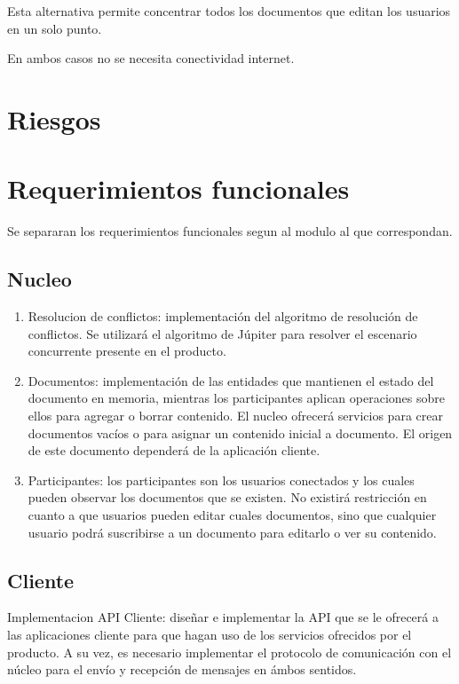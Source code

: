 \documentclass[12pt,a4paper]{article}
\begin{document}
Esta alternativa permite concentrar todos los documentos que editan los usuarios en un solo punto.

En ambos casos no se necesita conectividad internet.	
	
	\section{Riesgos}
	\section{Requerimientos funcionales}
	
	Se separaran los requerimientos funcionales segun al modulo al que correspondan.

	\subsection{Nucleo}
	\begin{enumerate}
	\item Resolucion de conflictos: implementación del algoritmo de resolución de conflictos. Se utilizará el algoritmo de Júpiter \cite{jupiter} para resolver el escenario concurrente presente en el producto.
	\item Documentos: implementación de las entidades que mantienen el estado del documento en memoria, mientras los participantes aplican operaciones sobre ellos para agregar o borrar contenido. El nucleo ofrecerá servicios para crear documentos vacíos o para asignar un contenido inicial a documento. El origen de este documento dependerá de la aplicación cliente.
	\item Participantes: los participantes son los usuarios conectados y los cuales pueden observar los documentos que se existen. No existirá restricción en cuanto a que usuarios pueden editar cuales documentos, sino que cualquier usuario podrá suscribirse a un documento para editarlo o ver su contenido.
	
	\end{enumerate}


	\subsection{Cliente}


Implementacion API Cliente: diseñar e implementar la API que se le ofrecerá a las aplicaciones cliente para que hagan uso de los servicios ofrecidos por el producto.
A su vez, es necesario implementar el protocolo de comunicación con el núcleo para el envío y recepción de mensajes en ámbos sentidos.
\end{document}
